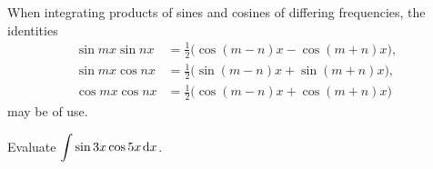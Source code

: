 \begin{remark}
When integrating products of sines and cosines of differing frequencies, the identities
\begin{align*}
\sin mx\sin nx &= \frac{1}{2}\big(\cos(m-n)x - \cos(m+n)x\big),\\
\sin mx\cos nx &= \frac{1}{2}\big(\sin(m-n)x + \sin(m+n)x\big),\\
\cos mx\cos nx &= \frac{1}{2}\big(\cos(m-n)x + \cos(m+n)x\big)
\end{align*}
may be of use.
\end{remark}

\begin{example}
Evaluate $\displaystyle\int \sin 3x\cos 5x\mkern 2mu \mathrm{d} x$.
\end{example}
\ifdefined\SOLUTION
{}
\fi
